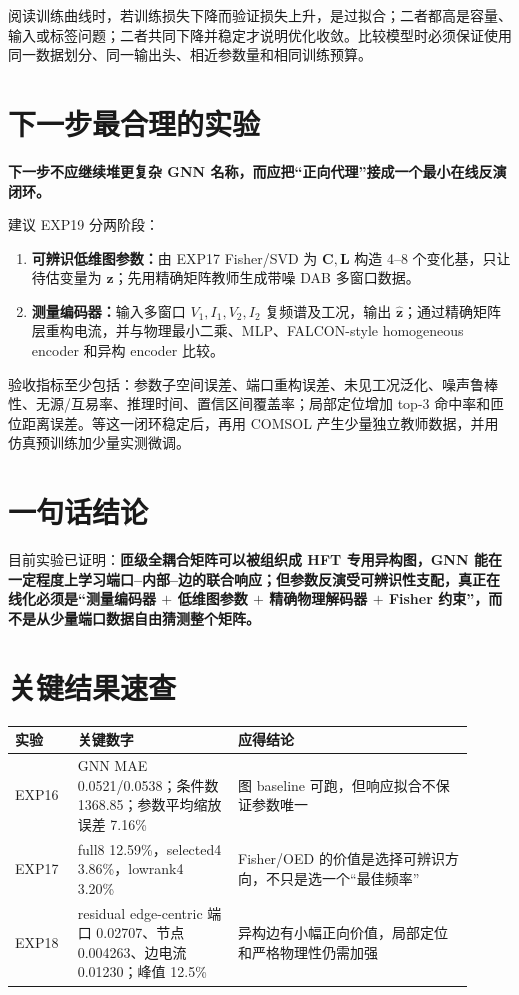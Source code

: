 \documentclass[UTF8,11pt,a4paper]{ctexart}
\newcommand{\mat}[1]{\bm{#1}}
\newcommand{\key}[1]{\textcolor{deep}{\textbf{#1}}}
\begin{document}
阅读训练曲线时，若训练损失下降而验证损失上升，是过拟合；二者都高是容量、输入或标签问题；二者共同下降并稳定才说明优化收敛。比较模型时必须保证使用同一数据划分、同一输出头、相近参数量和相同训练预算。

\section{下一步最合理的实验}

\key{下一步不应继续堆更复杂 GNN 名称，而应把“正向代理”接成一个最小在线反演闭环。}

建议 EXP19 分两阶段：
\begin{enumerate}
\item \textbf{可辨识低维图参数：}由 EXP17 Fisher/SVD 为 $\mat C,\mat L$ 构造 4--8 个变化基，只让待估变量为 $\bm z$；先用精确矩阵教师生成带噪 DAB 多窗口数据。
\item \textbf{测量编码器：}输入多窗口 $V_1,I_1,V_2,I_2$ 复频谱及工况，输出 $\hat{\bm z}$；通过精确矩阵层重构电流，并与物理最小二乘、MLP、FALCON-style homogeneous encoder 和异构 encoder 比较。
\end{enumerate}

验收指标至少包括：参数子空间误差、端口重构误差、未见工况泛化、噪声鲁棒性、无源/互易率、推理时间、置信区间覆盖率；局部定位增加 top-3 命中率和匝位距离误差。等这一闭环稳定后，再用 COMSOL 产生少量独立教师数据，并用仿真预训练加少量实测微调。

\section{一句话结论}

目前实验已证明：\key{匝级全耦合矩阵可以被组织成 HFT 专用异构图，GNN 能在一定程度上学习端口--内部--边的联合响应；但参数反演受可辨识性支配，真正在线化必须是“测量编码器 $+$ 低维图参数 $+$ 精确物理解码器 $+$ Fisher 约束”，而不是从少量端口数据自由猜测整个矩阵。}

\appendix
\section{关键结果速查}
\begin{longtable}{p{0.12\linewidth}p{0.32\linewidth}p{0.47\linewidth}}
\toprule
实验 & 关键数字 & 应得结论\\
\midrule
EXP16 & GNN MAE 0.0521/0.0538；条件数 1368.85；参数平均缩放误差 7.16\% & 图 baseline 可跑，但响应拟合不保证参数唯一\\
EXP17 & full8 12.59\%，selected4 3.86\%，lowrank4 3.20\% & Fisher/OED 的价值是选择可辨识方向，不只是选一个“最佳频率”\\
EXP18 & residual edge-centric 端口 0.02707、节点 0.004263、边电流 0.01230；峰值 12.5\% & 异构边有小幅正向价值，局部定位和严格物理性仍需加强\\
\bottomrule
\end{longtable}
\end{document}
